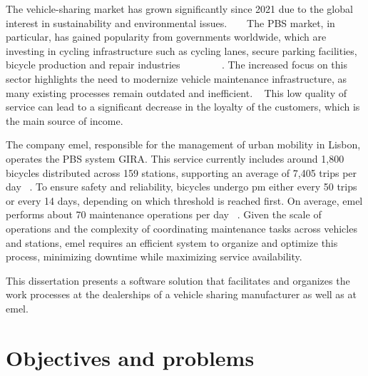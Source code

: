 The vehicle-sharing market has grown significantly since 2021 due to the global interest in sustainability and environmental issues. ~\cite{cohesionOpenData} ~\cite{bike_data_businessresearch}
The \acs{PBS} market, in particular, has gained popularity from governments worldwide, which are investing in cycling infrastructure such as cycling lanes, secure parking facilities, bicycle production and repair industries ~\cite{Clercq2023} ~\cite{Cerro2024} ~\cite{European_declararion_on_cycling} ~\cite{bike_data_businessresearch} ~\cite{cohesionOpenData}.
The increased focus on this sector highlights the need to modernize vehicle maintenance infrastructure, as many existing processes remain outdated and inefficient. ~\cite{MAS_MOTORS}
This low quality of service can lead to a significant decrease in the loyalty of the customers, which is the main source of income. ~\cite{Setting_the_after_sale_process}


The company \acs{emel}, responsible for the management of urban mobility in Lisbon, operates the \acs{PBS} system GIRA. This service currently includes around 1,800 bicycles distributed across 159 stations, supporting an average of 7,405 trips per day ~\cite{Gira_Trips}. To ensure safety and reliability, bicycles undergo \acs{pm} either every 50 trips or every 14 days, depending on which threshold is reached first. On average, \acs{emel} performs about 70 maintenance operations per day ~\cite{Gira_Maintenance}. Given the scale of operations and the complexity of coordinating maintenance tasks across vehicles and stations, \acs{emel} requires an efficient system to organize and optimize this process, minimizing downtime while maximizing service availability.

This dissertation presents a software solution that facilitates and organizes the work processes at the dealerships of a vehicle sharing manufacturer as well as at \acs{emel}. 


\section{Objectives and problems}

